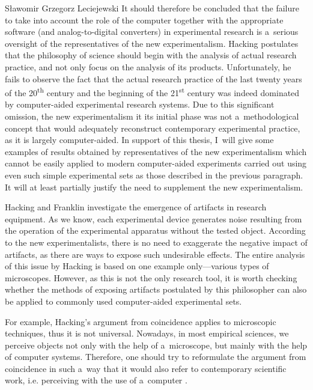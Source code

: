 \begin{artengenv}{Sławomir Grzegorz Leciejewski}
It should therefore be concluded that the failure to take into account the role of the computer together with the appropriate software (and analog-to-digital converters) in experimental research is a~serious oversight of the representatives of the new experimentalism. Hacking postulates that the philosophy of science should begin with the analysis of actual research practice, and not only focus on the analysis of its products. Unfortunately, he fails to observe the fact that the actual research practice of the last twenty years of the 20\textsuperscript{th} century and the beginning of the 21\textsuperscript{st} century was indeed dominated by computer-aided experimental research systems. Due to this significant omission, the new experimentalism it its initial phase was not a~methodological concept that would adequately reconstruct contemporary experimental practice, as it is largely computer-aided. In support of this thesis, I~will give some examples of results obtained by representatives of the new experimentalism which cannot be easily applied to modern computer-aided experiments carried out using even such simple experimental sets as those described in the previous paragraph. It will at least partially justify the need to supplement the new experimentalism.



Hacking and Franklin investigate the emergence of artifacts in research equipment. As we know, each experimental device generates noise resulting from the operation of the experimental apparatus without the tested object. According to the new experimentalists, there is no need to exaggerate the negative impact of artifacts, as there are ways to expose such undesirable effects. The entire analysis of this issue by Hacking is based on one example only---various types of microscopes. However, as this is not the only research tool, it is worth checking whether the methods of exposing artifacts postulated by this philosopher can also be applied to commonly used computer-aided experimental sets.



For example, Hacking's argument from coincidence applies to microscopic techniques, thus it is not universal. Nowadays, in most empirical sciences, we perceive objects not only with the help of a~microscope, but mainly with the help of computer systems. Therefore, one should try to reformulate the argument from coincidence in such a~way that it would also refer to contemporary scientific work, i.e. perceiving with the use of a~computer 
\parencite[][]{bialynicki-birula_modeling_2004}.%





\end{artengenv}
